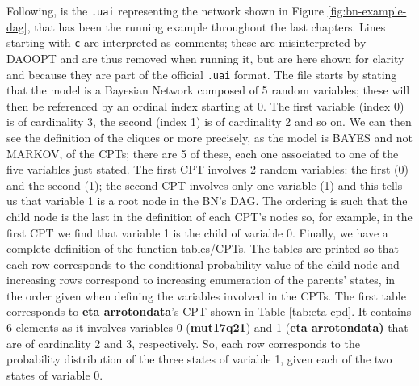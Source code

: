 Following, is the \texttt{.uai} representing the network shown in Figure \ref{fig:bn-example-dag}, that has been the running example throughout the last chapters.
Lines starting with \texttt{c} are interpreted as comments; these are misinterpreted by DAOOPT and are thus removed when running it, but are here shown for clarity and because they are part of the official \texttt{.uai} format.
The file starts by stating that the model is a Bayesian Network composed of 5 random variables; these will then be referenced by an ordinal index starting at 0.
The first variable (index 0) is of cardinality 3, the second (index 1) is of cardinality 2 and so on.
We can then see the definition of the cliques or more precisely, as the model is BAYES  and not MARKOV, of the CPTs; there are 5 of these, each one associated to one of the five variables just stated.
The first CPT involves 2 random variables: the first (0) and the second (1); the second CPT involves only one variable (1) and this tells us that variable 1 is a root node in the BN's DAG.
The ordering is such that the child node is the last in the definition of each CPT's nodes so, for example, in the first CPT we find that variable 1 is the child of variable 0.
Finally, we have a complete definition of the function tables/CPTs.
The tables are printed so that each row corresponds to the conditional probability value of the child node and increasing rows correspond to increasing enumeration of the parents' states, in the order given when defining the variables involved in the CPTs.
The first table corresponds to \textbf{eta arrotondata}'s CPT shown in Table \ref{tab:eta-cpd}.
It contains 6 elements as it involves variables 0 (\textbf{mut17q21}) and 1 (\textbf{eta arrotondata)} that are of cardinality 2 and 3, respectively.
So, each row corresponds to the probability distribution of the three states of variable 1, given each of the two states of variable 0.

